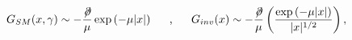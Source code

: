 \begin{equation}
G_{SM}(x,\gamma)\sim -\frac{\not\! \partial}{\mu} \exp {(-\mu |x|)}
\makebox[.5in]{,}
G_{inv}(x)\sim-\frac{\not\! \partial}{\mu} \left(\frac{\exp {(-\mu |x|)}}{|x|^{1/2}}\right),
\label{1}
\end{equation}

